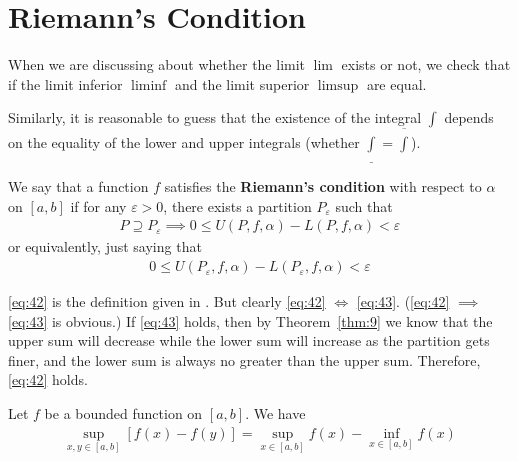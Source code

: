 \documentclass[thmcnt=section, color=blue, 12pt]{my-elegantbook}
\begin{document}
\section{Riemann's Condition}

When we are discussing about whether
the limit $\lim$ exists or not,
we check that if
the limit inferior $\liminf$
and the limit superior $\limsup$
are equal.

Similarly, it is reasonable to guess that
the existence of the integral $\int$ depends on
the equality of the lower and upper integrals
(whether $\underline{\int} = \overline{\int}$).


\begin{definition}
	We say that a function $f$
	satisfies the \textbf{Riemann's condition}
	with respect to $\alpha$ on $[a, b]$
	if for any $\varepsilon > 0$,
	there exists a partition $P_\varepsilon$ such that
	\begin{align}
		P \supseteq P_\varepsilon
		\implies
		0 \leq U(P, f, \alpha) - L(P, f, \alpha) < \varepsilon
		\label{eq:42}
	\end{align}
	or equivalently, just saying that
	\begin{align}
		0 \leq U(P_\varepsilon, f, \alpha) - L(P_\varepsilon, f, \alpha) < \varepsilon
		\label{eq:43}
	\end{align}
\end{definition}

\begin{note}
	\eqref{eq:42} is the definition given in \cite{apostolMathematicalAnalysisModern1974}.
	But clearly \eqref{eq:42} $\iff$ \eqref{eq:43}.
	(\eqref{eq:42} $\implies$ \eqref{eq:43} is obvious.)
	If \eqref{eq:43} holds,
	then by Theorem~\ref{thm:9}
	we know that the upper sum will decrease while the lower sum will increase
	as the partition gets finer,
	and the lower sum is always no greater than the upper sum.
	Therefore, \eqref{eq:42} holds.
\end{note}

\begin{proposition} \label{prop:7}
	Let $f$ be a bounded function on $[a, b]$. We have
	\begin{align*}
		\sup_{x, y \in [a, b]} [f(x) - f(y)]
		= \sup_{x \in [a, b]} f(x) - \inf_{x \in [a, b]} f(x)
	\end{align*}
\end{proposition}
\end{document}
